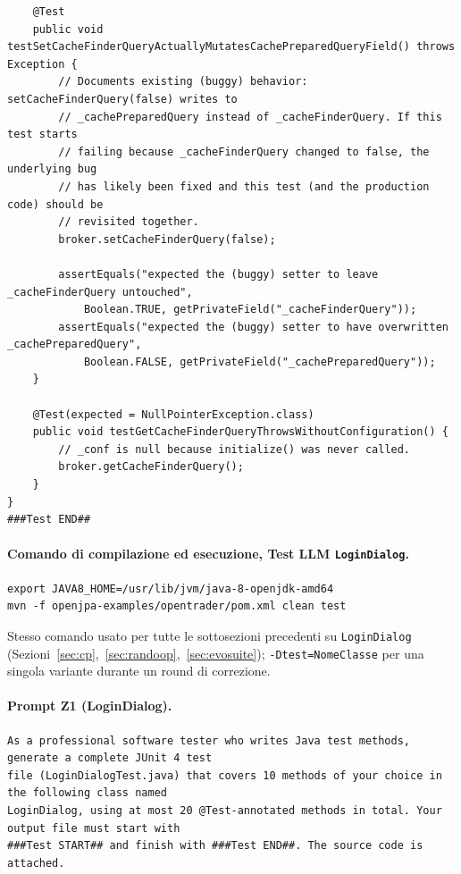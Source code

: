 \begin{lstlisting}
    @Test
    public void testSetCacheFinderQueryActuallyMutatesCachePreparedQueryField() throws Exception {
        // Documents existing (buggy) behavior: setCacheFinderQuery(false) writes to
        // _cachePreparedQuery instead of _cacheFinderQuery. If this test starts
        // failing because _cacheFinderQuery changed to false, the underlying bug
        // has likely been fixed and this test (and the production code) should be
        // revisited together.
        broker.setCacheFinderQuery(false);

        assertEquals("expected the (buggy) setter to leave _cacheFinderQuery untouched",
            Boolean.TRUE, getPrivateField("_cacheFinderQuery"));
        assertEquals("expected the (buggy) setter to have overwritten _cachePreparedQuery",
            Boolean.FALSE, getPrivateField("_cachePreparedQuery"));
    }

    @Test(expected = NullPointerException.class)
    public void testGetCacheFinderQueryThrowsWithoutConfiguration() {
        // _conf is null because initialize() was never called.
        broker.getCacheFinderQuery();
    }
}
###Test END##
\end{lstlisting}

\paragraph*{Comando di compilazione ed esecuzione, Test LLM \texttt{LoginDialog}.}
\label{cmd:test-logindialog}
\begin{lstlisting}
export JAVA8_HOME=/usr/lib/jvm/java-8-openjdk-amd64
mvn -f openjpa-examples/opentrader/pom.xml clean test
\end{lstlisting}
Stesso comando usato per tutte le sottosezioni precedenti su \texttt{LoginDialog}
(Sezioni~\ref{sec:cp},~\ref{sec:randoop},~\ref{sec:evosuite}); \texttt{-Dtest=NomeClasse} per una
singola variante durante un round di correzione.

\paragraph*{Prompt Z1 (LoginDialog).}
\label{prompt:ld-z1}
\begin{lstlisting}
As a professional software tester who writes Java test methods, generate a complete JUnit 4 test
file (LoginDialogTest.java) that covers 10 methods of your choice in the following class named
LoginDialog, using at most 20 @Test-annotated methods in total. Your output file must start with
###Test START## and finish with ###Test END##. The source code is attached.
\end{lstlisting}

